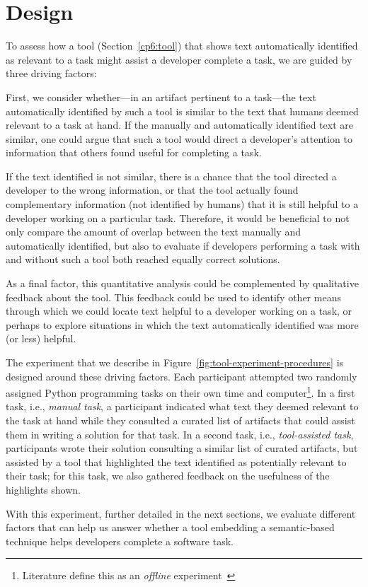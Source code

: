 
\section{Design}
\label{cp6:design}



To assess how a tool (Section~\ref{cp6:tool}) that shows text automatically identified as relevant to a task
might assist a developer complete a task, we are guided by three driving factors:


First, we consider whether---in an artifact pertinent to a task---the  text automatically identified by such a tool is similar to the text that humans deemed relevant to a task at hand. 
If the manually and automatically identified text are similar, one could argue that such a tool  
would direct a developer's attention to information that others found useful for completing a task.


If the text identified is not similar, there is a chance that the tool directed a developer to the wrong information, or that 
the tool actually found complementary information (not identified by humans) that it is still helpful to a developer working on a particular task. 
Therefore, it would be beneficial to not only compare the amount of overlap between the text manually
and automatically identified, but also to evaluate if developers performing a task with and without such a tool  
both reached equally correct solutions.


As a final factor, this quantitative analysis could be complemented by qualitative feedback about the tool. 
This feedback could be used to identify other means through which we could locate 
text helpful to a developer working on a task, or perhaps to explore
situations in which the text automatically identified 
was more (or less) helpful.



The experiment that we describe in Figure~\ref{fig:tool-experiment-procedures} is designed around these driving factors.  
Each participant attempted two randomly assigned Python programming tasks on their own time and computer\footnote{Literature define this as an \textit{offline} experiment~\cite{wohlin2012, DeLucia2012}}.
In a first task, i.e., \textit{manual task}, a participant indicated 
what text they deemed relevant to the task at hand while 
they consulted a curated list of artifacts that could assist them in writing a solution for that task.
In a second task, i.e., \textit{tool-assisted task},
participants wrote their solution consulting a similar list of curated artifacts, but
assisted by a tool that highlighted the text identified as potentially relevant to their task; for this task, we also gathered feedback on the usefulness of the highlights shown.

 

With this experiment, further detailed in the next sections, we evaluate different factors that can help us answer whether 
a tool embedding a semantic-based technique helps developers complete a software task. 

